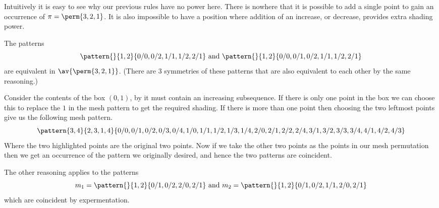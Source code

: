 Intuitively it is easy to see why our previous rules have no
power here. There is nowhere that it is possible to add a single point to
gain an occurrence of \(\pi = \perm{3,2,1}\). It is also impossible to have
a position where addition of an increase, or decrease, provides extra
shading power.

The patterns
\begin{equation*}
    \pattern{}{1,2}{0/0, 0/2, 1/1, 1/2, 2/1} \text { and } \pattern{}{1,2}{0/0, 0/1, 0/2, 1/1, 1/2, 2/1}
\end{equation*}
are equivalent in \(\av{\perm{3,2,1}}\). (There are 3 symmetries of these
patterns that are also equivalent to each other by the same reasoning.)

Consider the contents of the box \((0,1)\), by  it
must contain an increasing subsequence. If there is only one point in the box
we can choose this to replace the \(1\) in the mesh pattern to get the
required shading. If there is more than one point then choosing the
two leftmost points give us the following mesh pattern.
\begin{equation*}
    \pattern{3,4}{2,3,1,4}{0/0, 0/1, 0/2, 0/3, 0/4,
                            1/0, 1/1, 1/2, 1/3, 1/4,
                            2/0, 2/1,2/2, 2/4,
                            3/1, 3/2, 3/3, 3/4,
                            4/1, 4/2, 4/3}
\end{equation*}
Where the two highlighted points are the original two points.
Now if we take the other two points as the points in our
mesh permutation then we get an occurrence of the pattern
we originally desired, and hence the two patterns are coincident.

The other reasoning applies to the patterns
\begin{equation*}
    m_1 = \pattern{}{1,2}{0/1,0/2,2/0,2/1} \text{ and } m_2 = \pattern{}{1,2}{0/1,0/2,1/1,2/0,2/1}
\end{equation*}
which are coincident by expermentation.

